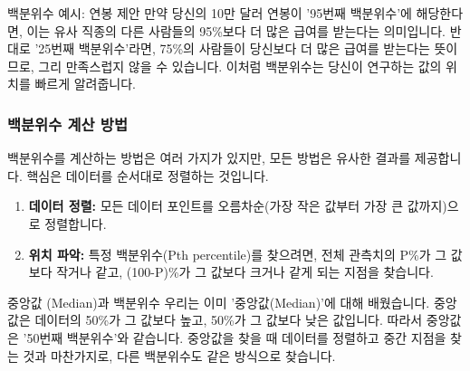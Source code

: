 \documentclass[11pt,a4paper]{article}
\begin{document}
\begin{examplebox}{백분위수 예시: 연봉 제안}
만약 당신의 10만 달러 연봉이 '95번째 백분위수'에 해당한다면, 이는 유사 직종의 다른 사람들의 95\%보다 더 많은 급여를 받는다는 의미입니다. 반대로 '25번째 백분위수'라면, 75\%의 사람들이 당신보다 더 많은 급여를 받는다는 뜻이므로, 그리 만족스럽지 않을 수 있습니다. 이처럼 백분위수는 당신이 연구하는 값의 위치를 빠르게 알려줍니다.
\end{examplebox}

\subsubsection*{백분위수 계산 방법}

백분위수를 계산하는 방법은 여러 가지가 있지만, 모든 방법은 유사한 결과를 제공합니다. 핵심은 데이터를 순서대로 정렬하는 것입니다.

\begin{enumerate}
    \item \textbf{데이터 정렬:} 모든 데이터 포인트를 오름차순(가장 작은 값부터 가장 큰 값까지)으로 정렬합니다.
    \item \textbf{위치 파악:} 특정 백분위수(Pth percentile)를 찾으려면, 전체 관측치의 P\%가 그 값보다 작거나 같고, (100-P)\%가 그 값보다 크거나 같게 되는 지점을 찾습니다.
\end{enumerate}

\begin{infobox}{중앙값 (Median)과 백분위수}
우리는 이미 '중앙값(Median)'에 대해 배웠습니다. 중앙값은 데이터의 50\%가 그 값보다 높고, 50\%가 그 값보다 낮은 값입니다. 따라서 중앙값은 '50번째 백분위수'와 같습니다. 중앙값을 찾을 때 데이터를 정렬하고 중간 지점을 찾는 것과 마찬가지로, 다른 백분위수도 같은 방식으로 찾습니다.
\end{infobox}
\end{document}
